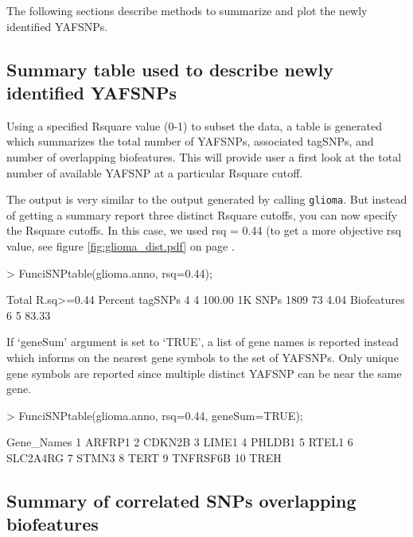 \documentclass[12pt,fullpage]{article}
\newcommand{\Robject}[1]{{\texttt{#1}}}
\begin{document}
The following sections describe methods to summarize and plot the newly
identified YAFSNPs.

\subsection{Summary table used to describe newly identified YAFSNPs}

Using a specified Rsquare value (0-1) to subset the data, a table is generated
which summarizes the total number of YAFSNPs, associated tagSNPs, and number
of overlapping biofeatures. This will provide user a first look at the total
number of available YAFSNP at a particular Rsquare cutoff.

The output is very similar to the output generated by calling \Robject{glioma}.
But instead of getting a summary report three distinct Rsquare cutoffs, you can
now specify the Rsquare cutoffs.  In this case, we used rsq = 0.44 (to get a
        more objective rsq value, see figure \ref{fig:glioma_dist.pdf} on page
        \pageref{fig:glioma_dist.pdf}.

\begin{Schunk}
\begin{Sinput}
> FunciSNPtable(glioma.anno, rsq=0.44);
\end{Sinput}
\begin{Soutput}
            Total R.sq>=0.44 Percent
tagSNPs         4          4  100.00
1K SNPs      1809         73    4.04
Biofeatures     6          5   83.33
\end{Soutput}
\end{Schunk}

If `geneSum' argument is set to `TRUE', a list of gene names is reported
instead which informs on the nearest gene symbols to the set of YAFSNPs.
Only unique gene symbols are reported since multiple distinct YAFSNP can be
near the same gene.

\begin{Schunk}
\begin{Sinput}
> FunciSNPtable(glioma.anno, rsq=0.44, geneSum=TRUE);
\end{Sinput}
\begin{Soutput}
   Gene_Names
1      ARFRP1
2      CDKN2B
3       LIME1
4      PHLDB1
5       RTEL1
6    SLC2A4RG
7       STMN3
8        TERT
9    TNFRSF6B
10       TREH
\end{Soutput}
\end{Schunk}

\subsection{Summary of correlated SNPs overlapping biofeatures}
\end{document}
